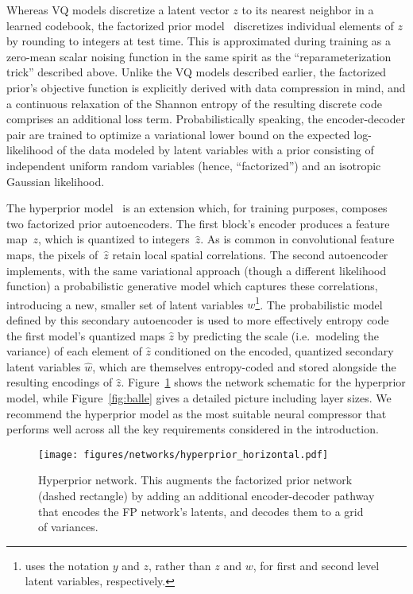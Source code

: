 \documentclass[11pt, a4paper, logo, copyright, numbering]{googledeepmind}
\begin{document}
Whereas VQ models discretize a latent vector $z$ to its nearest neighbor in a learned codebook, the factorized prior model~\citep{balle2017fp} discretizes individual elements of $z$ by rounding to integers at test time.
This is approximated during training as a zero-mean scalar noising function in the same spirit as the ``reparameterization trick'' described above.
Unlike the VQ models described earlier, the factorized prior's objective function is explicitly derived with data compression in mind, and a continuous relaxation of the Shannon entropy of the resulting discrete code comprises an additional loss term.
Probabilistically speaking, the encoder-decoder pair are trained to optimize a variational lower bound on the expected log-likelihood of the data modeled by latent variables with a prior consisting of independent uniform random variables (hence, ``factorized'') and an isotropic Gaussian likelihood.


The hyperprior model~\citep{balle2018hp} is an extension which, for training purposes, composes two factorized prior autoencoders.
The first block's encoder produces a feature map~$z$, which is quantized to integers~$\hat z$.
As is common in convolutional feature maps, the pixels of~$\hat{z}$ retain local spatial correlations.
The second autoencoder implements, with the same variational approach (though a different likelihood function) a probabilistic generative model which captures these correlations, introducing a new, smaller set of latent variables $w$\footnote{\citet{balle2018hp} uses the notation $y$ and $z$, rather than $z$ and $w$, for first and second level latent variables, respectively.}.
The probabilistic model defined by this secondary autoencoder is used to more effectively entropy code the first model's quantized maps $\hat{z}$ by predicting the scale (i.e.\ modeling the variance) of each element of $\hat{z}$ conditioned on the encoded, quantized secondary latent variables $\hat{w}$, which are themselves entropy-coded and stored alongside the  resulting encodings of $\hat{z}$.
Figure~\ref{fig:hyperprior} shows the network schematic for the hyperprior model, while Figure~\ref{fig:balle} gives a detailed picture including layer sizes.
We recommend the hyperprior model as the most suitable neural compressor that performs well across all the key requirements considered in the introduction.

\begin{figure}
    \centering
    \texttt{[image: figures/networks/hyperprior\_horizontal.pdf]}
    \caption{Hyperprior network. This augments the factorized prior network (dashed rectangle) by adding an additional encoder-decoder pathway that encodes the FP network's latents, and decodes them to a grid of variances.}
    \label{fig:hyperprior}
\end{figure}
\end{document}
